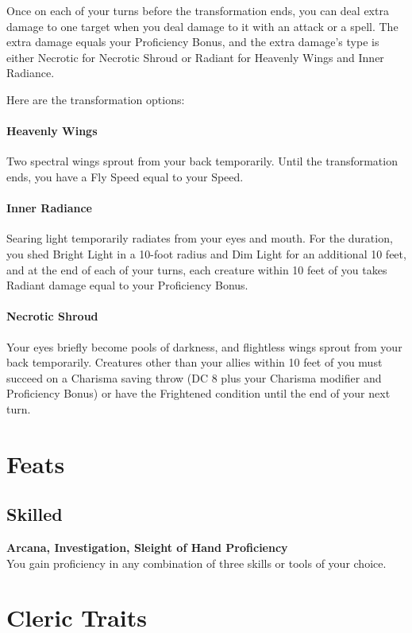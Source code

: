 \documentclass[letterpaper,openany,oneside,twocolumn]{book}
\begin{document}
Once on each of your turns before the transformation ends, you can deal extra damage to one target when you deal damage to it with an attack or a spell. The extra damage equals your Proficiency Bonus, and the extra damage's type is either Necrotic for Necrotic Shroud or Radiant for Heavenly Wings and Inner Radiance.

Here are the transformation options:

\paragraph*{Heavenly Wings} Two spectral wings sprout from your back temporarily. Until the transformation ends, you have a Fly Speed equal to your Speed.

\paragraph*{Inner Radiance} Searing light temporarily radiates from your eyes and mouth. For the duration, you shed Bright Light in a 10-foot radius and Dim Light for an additional 10 feet, and at the end of each of your turns, each creature within 10 feet of you takes Radiant damage equal to your Proficiency Bonus.

\paragraph*{Necrotic Shroud} Your eyes briefly become pools of darkness, and flightless wings sprout from your back temporarily. Creatures other than your allies within 10 feet of you must succeed on a Charisma saving throw (DC 8 plus your Charisma modifier and Proficiency Bonus) or have the Frightened condition until the end of your next turn.

\section*{Feats}
\subsection*{Skilled}
\textbf{Arcana, Investigation, Sleight of Hand Proficiency}\\
You gain proficiency in any combination of three skills or tools of your choice.

\section*{Cleric Traits}
\end{document}
